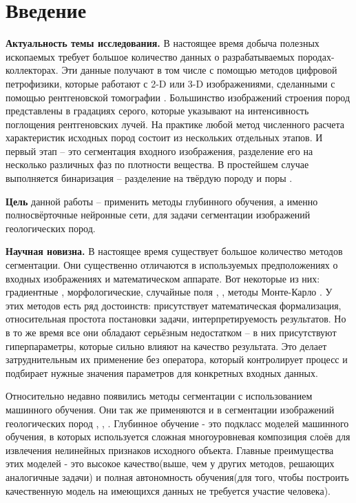 \documentclass[14pt, a4paper, oneside, bold]{extarticle}
\begin{document}
\newpage

\tableofcontents

\newpage


\section*{Введение}

\textbf{Актуальность темы исследования.} В настоящее время добыча полезных ископаемых требует большое количество 
данных о разрабатываемых породах-коллекторах. Эти данные получают в том числе с помощью методов цифровой петрофизики, которые работают с  
2-D или 3-D изображениями, сделанными с помощью рентгеновской томографии \cite{1}. Большинство изображений строения пород представлены в градациях серого, которые указывают на интенсивность поглощения рентгеновских лучей. На практике любой метод численного расчета характеристик исходных пород состоит из нескольких отдельных этапов. 
И первый этап -- это сегментация входного изображения, разделение его
на несколько различных фаз по плотности вещества. В простейшем случае выполняется бинаризация -- разделение на твёрдую породу и поры \cite{2}. 

\textbf{Цель} данной работы -- применить методы глубинного обучения, а именно полносвёрточные нейронные сети, для задачи сегментации изображений геологических пород.

\textbf{Научная новизна.} В настоящее время существует большое количество методов сегментации. Они существенно отличаются в используемых предположениях о входных изображениях и математическом аппарате. Вот некоторые из них: градиентные \cite{16}, морфологические, случайные поля \cite{14}, \cite{15}, методы Монте-Карло \cite{13}. У этих методов есть ряд достоинств: присутствует математическая формализация, относительная простота постановки задачи, интерпретируемость результатов. Но в то же время все они обладают серьёзным недостатком -- в них присутствуют гиперпараметры, которые сильно влияют на качество результата. Это делает затруднительным их применение без оператора, который контролирует процесс и подбирает нужные значения параметров для  конкретных входных данных. 

Относительно недавно появились методы сегментации с использованием машинного обучения. Они так же применяются и в сегментации изображений геологических пород \cite{3}, \cite{4}, \cite{5}. Глубинное обучение - это подкласс моделей машинного обучения, в которых используется сложная многоуровневая композиция слоёв для извлечения нелинейных признаков исходного объекта. Главные преимущества этих моделей - это высокое качество(выше, чем у других методов, решающих аналогичные задачи) и полная автономность обучения(для того, чтобы построить качественную модель на имеющихся данных не требуется участие человека).
\end{document}
